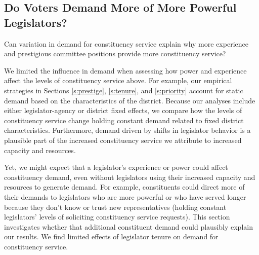 \documentclass[12pt]{article}
\begin{document}


\subsection{Do Voters Demand More of More Powerful Legislators?}

Can variation in demand for constituency service explain why more experience and prestigious committee positions provide more constituency service? 

We limited the influence in demand when assessing how power and experience affect the levels of constituency service above. For example, our empirical strategies in Sections \ref{s:prestige}, \ref{s:tenure}, and \ref{s:priority} account for static demand based on the characteristics of the district. %
Because our analyses include either legislator-agency or district fixed effects, we compare how the levels of constituency service change holding constant demand related to fixed district characteristics. Furthermore, %
demand driven by shifts in legislator behavior is a plausible part of the increased constituency service we attribute to increased capacity and resources.

Yet, we might expect that a legislator's experience or power could affect constituency demand, even without legislators using their increased capacity and resources to generate demand. %
For example, constituents could direct more of their demands to legislators who are more powerful or who have served longer because they don't know or trust new representatives (holding constant legislators' levels of soliciting constituency service requests). This section investigates whether that additional constituent demand could plausibly explain our results. We find limited effects of legislator tenure on demand for constituency service. 
\end{document}
